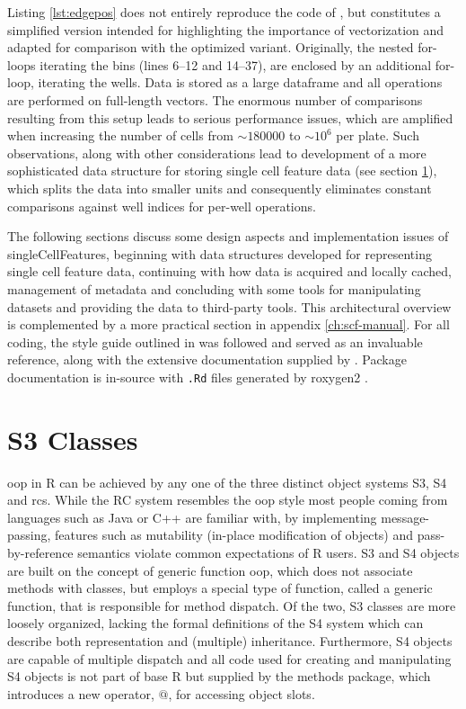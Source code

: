 Listing \ref{lst:edgepos} does not entirely reproduce the code of \citeauthor{Knapp2011}, but constitutes a simplified version intended for highlighting the importance of vectorization and adapted for comparison with the optimized variant. Originally, the nested for-loops iterating the bins (lines 6--12 and 14--37), are enclosed by an additional for-loop, iterating the wells. Data is stored as a large dataframe and all operations are performed on full-length vectors. The enormous number of comparisons resulting from this setup leads to serious performance issues, which are amplified when increasing the number of cells from $\sim 180000$ to $\sim 10^6$ per plate. Such observations, along with other considerations lead to development of a more sophisticated data structure for storing single cell feature data (see section \ref{sec:s3-objects}), which splits the data into smaller units and consequently eliminates constant comparisons against well indices for per-well operations.

The following sections discuss some design aspects and implementation issues of singleCellFeatures, beginning with data structures developed for representing single cell feature data, continuing with how data is acquired and locally cached, management of metadata and concluding with some tools for manipulating datasets and providing the data to third-party tools. This architectural overview is complemented by a more practical section in appendix \ref{ch:scf-manual}. For all coding, the style guide outlined in \cite{Wickham2014} was followed and \cite{Wickham2015} served as an invaluable reference, along with the extensive documentation supplied by \cite{RCoreTeam2015}. Package documentation is in-source with \texttt{.Rd} files generated by roxygen2 \citep{Wickham2015a}.

\section{S3 Classes}
\label{sec:s3-objects}
\Gls{oop} in R can be achieved by any one of the three distinct object systems S3, S4 and \glspl{rc}. While the RC system resembles the \gls{oop} style most people coming from languages such as Java or C++ are familiar with, by implementing message-passing, features such as mutability (in-place modification of objects) and pass-by-reference semantics violate common expectations of R users. S3 and S4 objects are built on the concept of generic function \gls{oop}, which does not associate methods with classes, but employs a special type of function, called a generic function, that is responsible for method dispatch. Of the two, S3 classes are more loosely organized, lacking the formal definitions of the S4 system which can describe both representation and (multiple) inheritance. Furthermore, S4 objects are capable of multiple dispatch and all code used for creating and manipulating S4 objects is not part of base R but supplied by the methods package, which introduces a new operator, $@$, for accessing object slots.

